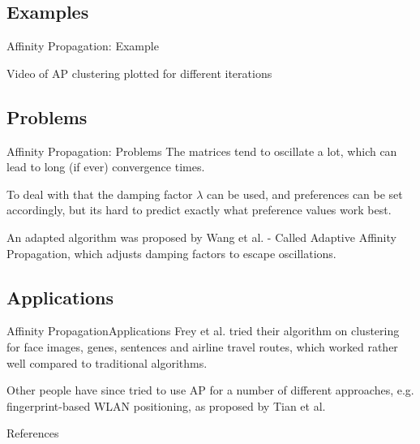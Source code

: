 \documentclass{beamer}
\begin{document}
\subsection{Examples}
\begin{frame}{Affinity Propagation: Example}
	\begin{center}
		Video of AP clustering plotted for different iterations
	\end{center}
\end{frame}

\subsection{Problems}
\begin{frame}{Affinity Propagation: Problems}
	The matrices tend to oscillate a lot, which can lead to long (if ever) convergence times. \cite{frey2007clustering} 
	
	To deal with that the damping factor $\lambda$ can be used, and preferences can be set accordingly, but its hard to predict exactly what preference values work best. \cite{wang2008adaptive}
	
	An adapted algorithm was proposed by Wang et al. - Called Adaptive Affinity Propagation, which adjusts damping factors to escape oscillations. \cite{wang2008adaptive}
\end{frame}

\subsection{Applications}
\begin{frame}{Affinity Propagation}{Applications}
	Frey et al. tried their algorithm on clustering for face images, genes, sentences and airline travel routes, which worked rather well compared to traditional algorithms. \cite{frey2007clustering}
	
	Other people have since tried to use AP for a number of different approaches, e.g. fingerprint-based WLAN positioning, as proposed by Tian et al. \cite{tian2013fingerprint}
\end{frame}

\begin{frame}{References}
	
\end{frame}
\end{document}
